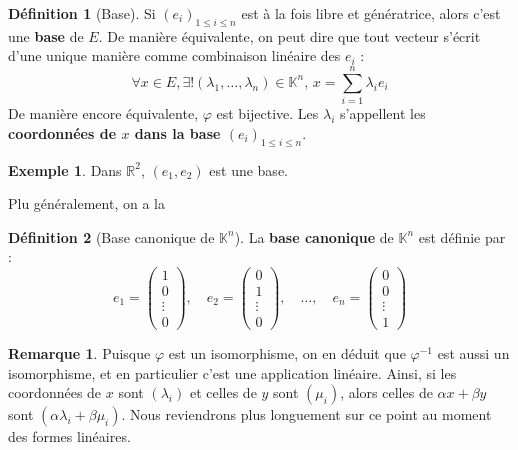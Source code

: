 \documentclass[french]{book}
\newcommand{\K}{\mathbb{K}}
\theoremstyle{plain}
\theoremstyle{definition}
\newtheorem{dfn}{Définition}[chapter]
\newtheorem{exa}{Exemple}[chapter]
\newtheorem{rmq}{Remarque}[chapter]
\theoremstyle{remark}
\begin{document}
\begin{center}
\end{center}
\begin{dfn}[Base]
	Si $(e_i)_{1 \leqslant i \leqslant n}$ est à la fois libre et génératrice, alors c'est une \textbf{base} de $E$. De manière équivalente, on peut dire que tout vecteur s'écrit d'une unique manière comme combinaison linéaire des $e_i$ : $$\forall x \in E, \exists!(\lambda_1, \dots, \lambda_n) \in \mathbb{K}^n, \, x = \sum_{i=1}^{n} \lambda_i e_i$$ De manière encore équivalente, $\varphi$ est bijective. Les $\lambda_i$ s'appellent les \textbf{coordonnées de $x$ dans la base $(e_i)_{1 \leqslant i \leqslant n}$}.
\end{dfn}
\begin{exa}
	Dans $\mathbb{R}^2$, $(e_1, e_2)$ est une base.
\end{exa}
Plu généralement, on a la
\begin{dfn}[Base canonique de $\K^n$]
	La \textbf{base canonique} de $\mathbb{K}^n$ est définie par : $$e_1 = \begin{pmatrix} 1 \\ 0 \\ \vdots \\ 0 \end{pmatrix}, \quad e_2 = \begin{pmatrix} 0 \\ 1 \\ \vdots \\ 0 \end{pmatrix}, \quad \dots, \quad e_n = \begin{pmatrix} 0 \\ 0 \\ \vdots \\ 1 \end{pmatrix}$$
\end{dfn}
\begin{rmq}
	Puisque $\varphi$ est un isomorphisme, on en déduit que $\varphi^{-1}$ est aussi un isomorphisme, et en particulier c'est une application linéaire. Ainsi, si les coordonnées de $x$ sont $(\lambda_i)$ et celles de $y$ sont $(\mu_i)$, alors celles de $\alpha x + \beta y$ sont $(\alpha \lambda_i + \beta \mu_i)$. Nous reviendrons plus longuement sur ce point au moment des formes linéaires.
\end{rmq}
\end{document}

